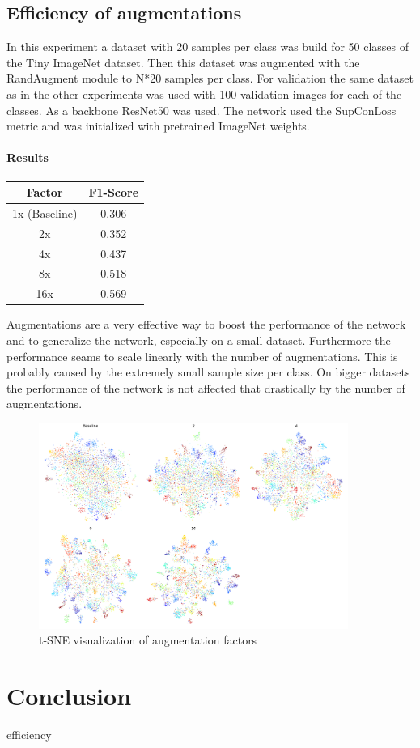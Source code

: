 \documentclass[12pt,a4paper]{report}
\begin{document}
\newpage

\section{Efficiency of augmentations}

In this experiment a dataset with 20 samples per class was build for 50 classes of the Tiny ImageNet dataset.
Then this dataset was augmented with the RandAugment module to N*20 samples per class.
For validation the same dataset as in the other experiments was used with 100 validation images for each of the classes.
As a backbone ResNet50 was used.
The network used the SupConLoss metric and was initialized with pretrained ImageNet weights.

\subsubsection{Results}
\begin{table}
	\begin{tabular}{ | c | c | }
		\hline
		Factor &  F1-Score \\ 
		\hline
		1x (Baseline) &  0.306  \\ 
		\hline
		2x & 0.352 \\ 
		\hline
		4x & 0.437 \\ 
		\hline
		8x & 0.518 \\ 
		\hline
		16x & 0.569  \\ 
		\hline
	\end{tabular}
\end{table} 

Augmentations are a very effective way to boost the performance of the network and 
to generalize the network,
especially on a small dataset.
Furthermore the performance seams to scale linearly with the number of augmentations.
This is probably caused by the extremely small sample size per class.
On bigger datasets the performance of the network is not affected that drastically by the number of augmentations.

\begin{figure}[hb]
	\centering
	\includegraphics[width=0.9\textwidth]{../plots/augmentation_size.png}
	\caption{t-SNE visualization of augmentation factors}
\end{figure}

\newpage

\chapter{Conclusion}

\newpage
efficiency 

\end{document}
